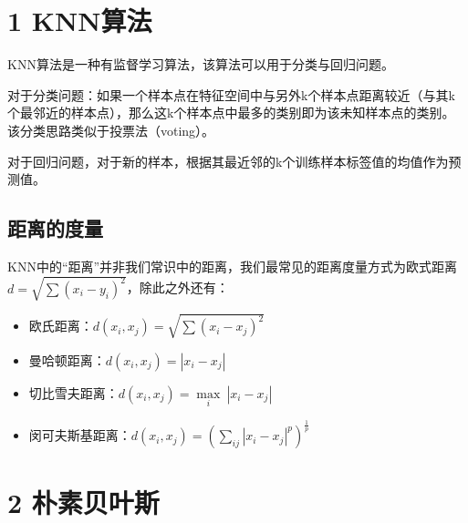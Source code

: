 \documentclass[twoside]{article}
\begin{document}
\section*{1 KNN算法}
KNN算法是一种有监督学习算法，该算法可以用于分类与回归问题。

对于分类问题：如果一个样本点在特征空间中与另外k个样本点距离较近（与其k个最邻近的样本点），那么这k个样本点中最多的类别即为该未知样本点的类别。该分类思路类似于投票法（voting）。

对于回归问题，对于新的样本，根据其最近邻的k个训练样本标签值的均值作为预测值。
\subsection*{距离的度量}
KNN中的“距离”并非我们常识中的距离，我们最常见的距离度量方式为欧式距离$d=\sqrt{\sum(x_i-y_i)^2}$，除此之外还有：
\begin{itemize}
    \item 欧氏距离：$d(x_i,x_j)=\sqrt{\sum(x_i-x_j)^2}$
    \item 曼哈顿距离：$d(x_i,x_j)=|x_i-x_j|$
    \item 切比雪夫距离：$d(x_i,x_j)=\underset{i}{\max}\ |x_i-x_j|$
    \item 闵可夫斯基距离：$d(x_i,x_j)=(\sum_{ij}|x_i-x_j|^p)^{\frac{1}{p}}$
\end{itemize}
\section*{2 朴素贝叶斯}
\end{document}
